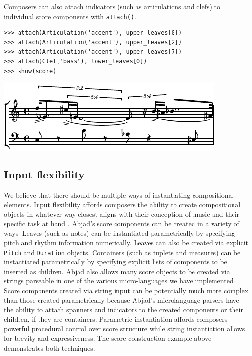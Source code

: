 \documentclass{article}
\begin{document}
Composers can also attach indicators (such as articulations and clefs) to
individual score components with \texttt{attach()}.

\begin{lstlisting}
>>> attach(Articulation('accent'), upper_leaves[0])
>>> attach(Articulation('accent'), upper_leaves[2])
>>> attach(Articulation('accent'), upper_leaves[7])
>>> attach(Clef('bass'), lower_leaves[0])
>>> show(score)
\end{lstlisting}
\includegraphics{assets/lilypond-6e6234ddf98e707d42a58b6306767fc8.pdf}

\subsection{Input flexibility}

We believe that there should be multiple ways of instantiating compositional
elements. Input flexibility affords composers the ability to create
compositional objects in whatever way closest aligns with their conception of
music and their specific task at hand \cite{Kay:1996vn}. Abjad's score components
can be created in a variety of ways. Leaves (such as notes) can be instantiated
parametrically by specifying pitch and rhythm information numerically. Leaves
can also be created via explicit \texttt{Pitch} and \texttt{Duration} objects.
Containers (such as tuplets and measures) can be instantiated parametrically by
specifying explicit lists of components to be inserted as children. Abjad also
allows many score objects to be created via strings parseable in one of the
various micro-languages we have implemented. Score components created via
string input can be potentially much more complex than those created
parametrically because Abjad's microlanguage parsers have the ability to attach
spanners and indicators to the created components or their children, if they
are containers. Parametric instantiation affords composers powerful procedural
control over score structure while string instantiation allows for brevity and
expressiveness. The score construction example above demonstrates both
techniques.
\end{document}
